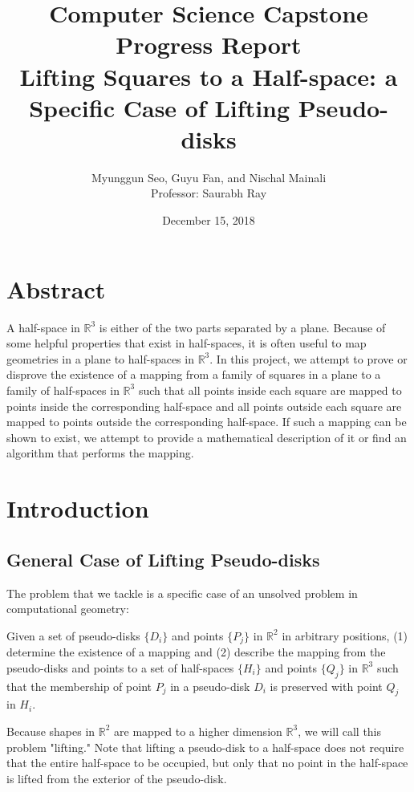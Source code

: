 \documentclass{NSF}
\begin{document}
\author{Myunggun Seo,  Guyu Fan, and Nischal Mainali \\ Professor: Saurabh Ray}
\date{December 15, 2018}
\title{
  {\normalfont Computer Science Capstone Progress Report} \\ 
  Lifting Squares to a Half-space: a Specific Case of Lifting Pseudo-disks
}
{\let\newpage\relax\maketitle}

\section{Abstract}
A half-space in $\mathbb{R}^3$ is either of the two parts separated by a plane. Because of some helpful properties that exist in half-spaces, it is often useful to map geometries in a plane to half-spaces in  $\mathbb{R}^3$. In this project, we attempt to prove or disprove the existence of a mapping from a family of squares in a plane to a family of half-spaces in $\mathbb{R}^3$ such that all points inside each square are mapped to points inside the corresponding half-space and all points outside each square are mapped to points outside the corresponding half-space. If such a mapping can be shown to exist, we attempt to provide a mathematical description of it or find an algorithm that performs the mapping. \cite{mainali2018}
\tableofcontents

\section{Introduction}
\subsection{General Case of Lifting Pseudo-disks}
The problem that we tackle is a specific case of an unsolved problem in computational geometry: 

Given a set of pseudo-disks $\{D_i\}$ and points $\{P_j\}$ in $\mathbb{R}^2$ in arbitrary positions, (1) determine the existence of a mapping and (2) describe the mapping from the pseudo-disks and points to a set of half-spaces $\{H_i\}$ and points $\{Q_j\}$ in $\mathbb{R}^3$ such that the membership of point $P_j$ in a pseudo-disk $D_i$ is preserved with point $Q_j$ in $H_i$. 

Because shapes in $\mathbb{R}^2$ are mapped to a higher dimension $\mathbb{R}^3$, we will call this problem "lifting." Note that lifting a pseudo-disk to a half-space does not require that the entire half-space to be occupied, but only that no point in the half-space is lifted from the exterior of the pseudo-disk.
\end{document}
